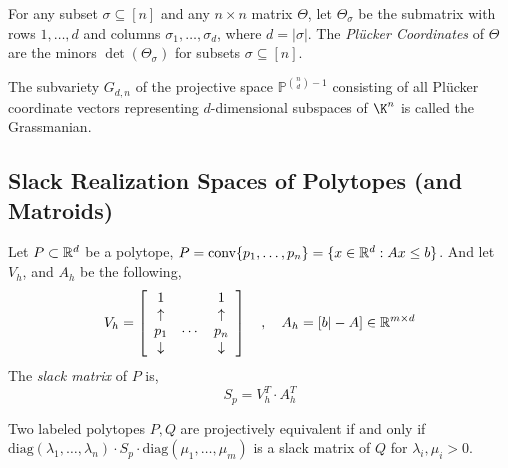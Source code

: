 \begin{definition}
    For any subset $\sigma \subseteq [n]$ and any $n \times n$ matrix $\Theta$, let $\Theta_{\sigma}$ be the submatrix with rows $1, \dots, d$ and columns $\sigma_1, \dots, \sigma_{d}$, where $d = |\sigma|$.
    The \textit{Pl\"ucker Coordinates} of $\Theta$ are the minors $\det(\Theta_{\sigma})$ for subsets $\sigma \subseteq [n]$.
\end{definition}

\begin{definition}[Grassmanian]
    The subvariety $G_{d,n}$ of the projective space $\mathbb{P}^{\binom{n}{d} -1}$ consisting of all Pl\"ucker coordinate vectors representing $d$-dimensional subspaces of $\K^n$ is called the Grassmanian.
\end{definition}

\subsection{Slack Realization Spaces of Polytopes (and Matroids)}

\begin{definition}
    Let $P \subset \mathbb{R}^d$ be a polytope, $P = \text{conv}\{p_1, \dots, p_n \} = \{ x \in \mathbb{R}^d : Ax \leq b \}$.
    And let $V_h$, and $A_h$ be the following,
    $$V_h = \left[ \begin{array}{c c c} 1 & & 1 \\ \uparrow & & \uparrow \\ p_1 & \cdots & p_n \\ \downarrow & & \downarrow \end{array} \right] \quad , \quad A_h = [ b | -A ] \in \mathbb{R}^{m \times d}$$
    The \textit{slack matrix} of $P$ is,
    $$S_p = V_{h}^T \cdot A_h^T$$
\end{definition}

\begin{proposition}
    Two labeled polytopes $P, Q$ are projectively equivalent if and only if $\text{diag}(\lambda_1, \dots, \lambda_n) \cdot S_p \cdot \text{diag}(\mu_1, \dots, \mu_m)$ is a slack matrix of $Q$ for $\lambda_i, \mu_i > 0$.
\end{proposition}
